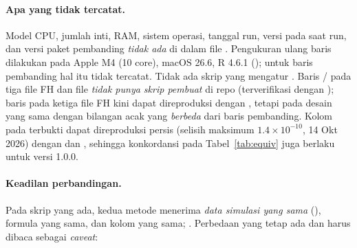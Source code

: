 \paragraph{Apa yang tidak tercatat.}
Model CPU, jumlah inti, RAM, sistem operasi, tanggal run, versi  pada
saat run, dan versi paket pembanding \emph{tidak ada} di dalam file
. Pengukuran ulang baris  dilakukan pada Apple M4
(10 core), macOS 26.6, R 4.6.1 (); untuk baris
pembanding hal itu tidak tercatat. Tidak ada skrip yang mengatur
. Baris / pada tiga file FH dan file
 \emph{tidak punya skrip pembuat} di repo
(terverifikasi dengan ); baris  pada ketiga file
FH kini dapat direproduksi dengan , tetapi
pada desain yang sama dengan bilangan acak yang \emph{berbeda} dari baris
pembanding. Kolom  pada 
terbukti dapat direproduksi persis (selisih maksimum $1.4\times10^{-10}$, 14 Okt
2026) dengan 
dan , sehingga
konkordansi pada Tabel~\ref{tab:equiv} juga berlaku untuk versi 1.0.0.

\paragraph{Keadilan perbandingan.}
Pada skrip yang ada, kedua metode menerima \emph{data simulasi yang sama}
(), formula yang sama,
dan kolom  yang sama; . Perbedaan yang tetap
ada dan harus dibaca sebagai \emph{caveat}:

